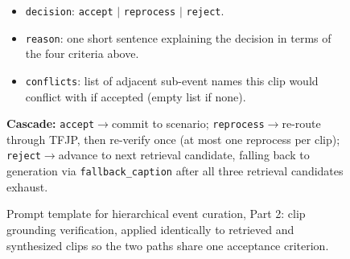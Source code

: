 \documentclass{article}
\begin{document}
\begin{figure}[H]
\begin{tcolorbox}
\begin{itemize}
  \item \texttt{decision}: \texttt{accept} $|$ \texttt{reprocess} $|$ \texttt{reject}.
  \item \texttt{reason}: one short sentence explaining the decision in
        terms of the four criteria above.
  \item \texttt{conflicts}: list of adjacent sub-event names this clip
        would conflict with if accepted (empty list if none).
\end{itemize}
\textbf{Cascade:} \texttt{accept}$\to$commit to scenario;
\texttt{reprocess}$\to$re-route through TFJP, then re-verify once
(at most one reprocess per clip); \texttt{reject}$\to$advance to next
retrieval candidate, falling back to generation via
\texttt{fallback\_caption} after all three retrieval candidates exhaust.
\end{tcolorbox}
\caption{Prompt template for hierarchical event curation, Part 2: clip
grounding verification, applied identically to retrieved and synthesized
clips so the two paths share one acceptance criterion.}
\label{prompt:curation-p2}
\end{figure}

\newpage    %
\end{document}
